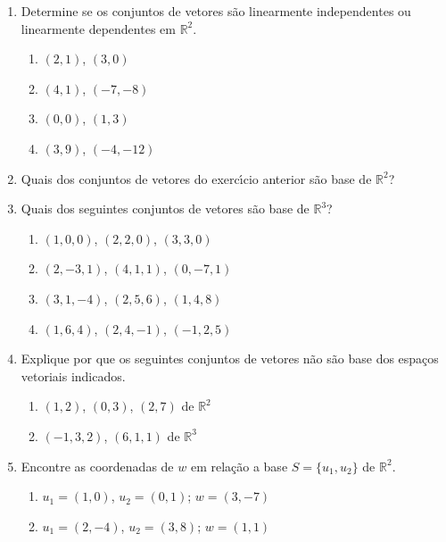 \documentclass[a4paper,5pt]{amsbook}
\begin{document}
\vspace{1cm}
\begin{enumerate}
	\vspace{0.5cm}
    \item Determine se os conjuntos de vetores s\~ao linearmente independentes ou
        linearmente dependentes em $\mathbb{R}^2$.
        \begin{enumerate}
            \item $(2,1)$, $(3,0)$
            \item $(4,1)$, $(-7,-8)$
            \item $(0,0)$, $(1,3)$
            \item $(3,9)$, $(-4,-12)$
        \end{enumerate}
        
    \vspace{0.5cm}
    \item Quais dos conjuntos de vetores do exerc\'{\i}cio anterior s\~ao base de
        $\mathbb{R}^2$?
        
    \vspace{0.5cm}
    \item Quais dos seguintes conjuntos de vetores s\~ao base de $\mathbb{R}^3$?
        \begin{enumerate}
            \item $(1,0,0)$, $(2,2,0)$, $(3,3,0)$
            \item $(2,-3,1)$, $(4,1,1)$, $(0,-7,1)$
            \item $(3,1,-4)$, $(2,5,6)$, $(1,4,8)$
            \item $(1,6,4)$, $(2,4,-1)$, $(-1,2,5)$
        \end{enumerate}

    \vspace{0.5cm}
    \item Explique por que os seguintes conjuntos de vetores n\~ao s\~ao base dos
        espa\c{c}os vetoriais indicados.
        \begin{enumerate}
            \item $(1,2)$, $(0,3)$, $(2,7)$ de $\mathbb{R}^2$
            \item $(-1,3,2)$, $(6,1,1)$ de $\mathbb{R}^3$
        \end{enumerate}

    \vspace{0.5cm}
    \item Encontre as coordenadas de $w$ em rela\c{c}\~ao a base $S=\{u_1,u_2\}$ de
        $\mathbb{R}^2$.
        \begin{enumerate}
            \item $u_1=(1,0)$, $u_2=(0,1)$; $w=(3,-7)$
            \item $u_1=(2,-4)$, $u_2=(3,8)$; $w=(1,1)$
        \end{enumerate}


\end{enumerate}
\end{document}
